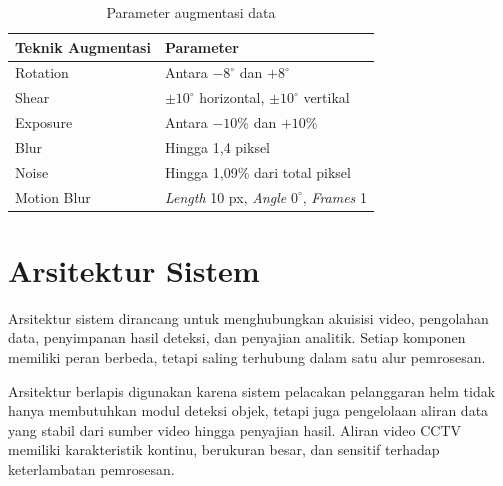 \begin{table}[htpb]
  \centering
  \caption{Parameter augmentasi data}
  \label{tab:augmentasi}
  \begin{tabular}{ll}
    \toprule
    \textbf{Teknik Augmentasi} & \textbf{Parameter} \\
    \midrule
    Rotation & Antara $-8^\circ$ dan $+8^\circ$ \\
    Shear & $\pm 10^\circ$ horizontal, $\pm 10^\circ$ vertikal \\
    Exposure & Antara $-10\%$ dan $+10\%$ \\
    Blur & Hingga 1,4 piksel \\
    Noise & Hingga 1,09\% dari total piksel \\
    Motion Blur & \textit{Length} 10 px, \textit{Angle} $0^\circ$, \textit{Frames} 1 \\
  \bottomrule
  \end{tabular}
\end{table}

\section{Arsitektur Sistem}

Arsitektur sistem dirancang untuk menghubungkan akuisisi video, pengolahan data, penyimpanan hasil deteksi, dan penyajian analitik. Setiap komponen memiliki peran berbeda, tetapi saling terhubung dalam satu alur pemrosesan.


Arsitektur berlapis digunakan karena sistem pelacakan pelanggaran helm tidak hanya membutuhkan modul deteksi objek, tetapi juga pengelolaan aliran data yang stabil dari sumber video hingga penyajian hasil. Aliran video CCTV memiliki karakteristik kontinu, berukuran besar, dan sensitif terhadap keterlambatan pemrosesan.


